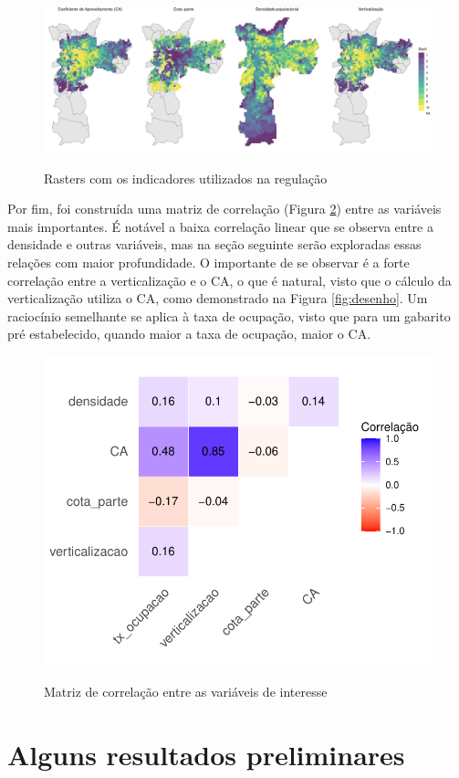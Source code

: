 \begin{figure}[h]
    \centering
    \caption{Rasters com os indicadores utilizados na regulação}
    \includegraphics[width = \linewidth]{imagens/rasters_wide.pdf}
    \label{fig:rasters}
\end{figure}

Por fim, foi construída uma matriz de correlação (Figura \ref{fig:corplot}) entre as variáveis mais importantes. É notável a baixa correlação linear que se observa entre a densidade e outras variáveis, mas na seção seguinte serão exploradas essas relações com maior profundidade. O importante de se observar é a forte correlação entre a verticalização e o CA, o que é natural, visto que o cálculo da verticalização utiliza o CA, como demonstrado na Figura \ref{fig:desenho}. Um raciocínio semelhante se aplica à taxa de ocupação, visto que para um gabarito pré estabelecido, quando maior a taxa de ocupação, maior o CA.

\begin{figure}[h]
    \centering
    \caption{Matriz de correlação entre as variáveis de interesse}
    \includegraphics[width = .6\textwidth]{imagens/corrplot.pdf}
    \label{fig:corplot}
\end{figure}


\section*{Alguns resultados preliminares}

